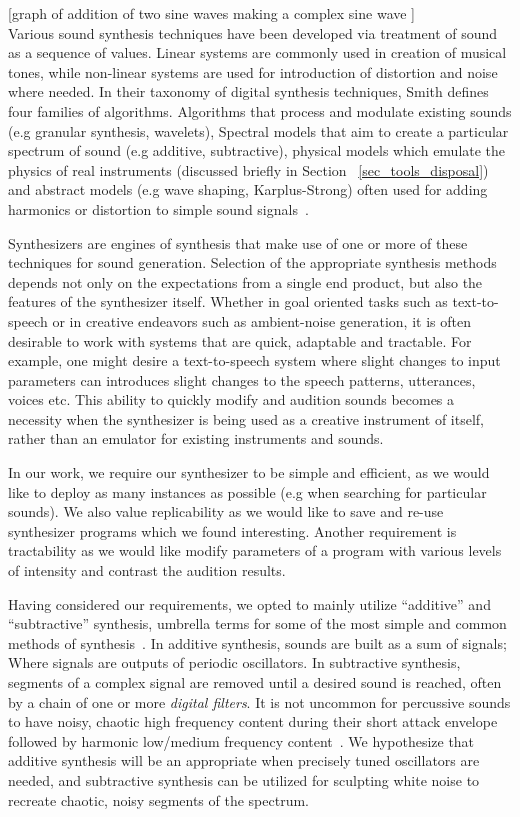\documentclass[\main/thesis.tex]{subfiles}
\begin{document}
[graph of addition of two sine waves making a complex sine wave ]
\\

Various sound synthesis techniques have been developed via treatment of sound as a sequence of values. Linear systems are commonly used in creation of musical tones, while non-linear systems are used for introduction of distortion and noise where needed. In their taxonomy of digital synthesis techniques, Smith defines four families of algorithms. Algorithms that process and modulate existing sounds (e.g granular synthesis, wavelets), Spectral models that aim to create a particular spectrum of sound (e.g additive, subtractive), physical models which emulate the physics of real instruments (discussed briefly in Section ~\ref{sec_tools_disposal}) and abstract models (e.g wave shaping, Karplus-Strong) often used for adding harmonics or distortion to simple sound signals~\cite{smith1991viewpoints}. 

Synthesizers are engines of synthesis that make use of one or more of these techniques for sound generation. Selection of the appropriate synthesis methods depends not only on the expectations from a single end product, but also the features of the synthesizer itself. Whether in goal oriented tasks such as text-to-speech or in creative endeavors such as ambient-noise generation, it is often desirable to work with systems that are quick, adaptable and tractable. For example, one might desire a text-to-speech system where slight changes to input parameters can introduces slight changes to the speech patterns, utterances, voices etc. This ability to quickly modify and audition sounds becomes a necessity when the synthesizer is being used as a creative instrument of itself, rather than an emulator for existing instruments and sounds. 

In our work, we require our synthesizer to be simple and efficient, as we would like to deploy as many instances as possible (e.g when searching for particular sounds). We also value replicability as we would like to save and re-use synthesizer programs which we found interesting. Another requirement is tractability as we would like modify parameters of a program with various levels of intensity and contrast the audition results.

Having considered our requirements, we opted to mainly utilize \enquote{additive} and \enquote{subtractive} synthesis, umbrella terms for some of the most simple and common methods of synthesis~\cite{mitchell2009basicsynthChap1}. 
In additive synthesis, sounds are built as a sum of signals; Where signals are outputs of periodic oscillators.  In subtractive synthesis, segments of a complex signal are removed until a desired sound is reached, often by a chain of one or more \textit{digital filters}. It is not uncommon for percussive sounds to have noisy, chaotic high frequency content during their short attack envelope followed by harmonic low/medium frequency content~\cite{lakatos2000common}. We hypothesize that additive synthesis will be an appropriate when precisely tuned oscillators are needed, and subtractive synthesis can be utilized for sculpting white noise to recreate chaotic, noisy segments of the spectrum. 
\end{document}
